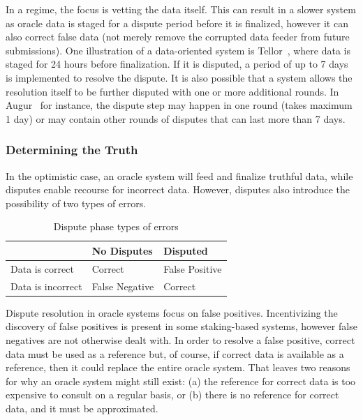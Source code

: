 In a  regime, the focus is vetting the data itself. This can result in a slower system as oracle data is staged for a dispute period before it is finalized, however it can also correct false data (not merely remove the corrupted data feeder from future submissions). One illustration of a data-oriented system is Tellor~\cite{tellorWhitepaper,tellordispute}, where data is staged for 24 hours before finalization. If it is disputed, a period of up to 7 days is implemented to resolve the dispute. It is also possible that a system allows the resolution itself to be further disputed with one or more additional rounds. In Augur~\cite{peterson2015augur} for instance, the dispute step may happen in one round (takes maximum 1 day) or may contain other rounds of disputes that can last more than 7 days. 



\subsubsection{Determining the Truth}

In the optimistic case, an oracle system will feed and finalize truthful data, while disputes enable recourse for incorrect data. However, disputes also introduce the possibility of two types of errors.

\begin{table}[t]
	\centering
\begin{tabular}{l|l|l|}
& No Disputes & Disputed \\ \hline
Data is correct & Correct & False Positive \\
Data is incorrect & False Negative & Correct \\
\end{tabular}
\caption[Dispute Phase Types of Errors]{Dispute phase types of errors}
\end{table}

Dispute resolution in oracle systems focus on false positives. Incentivizing the discovery of false positives is present in some staking-based systems, however false negatives are not otherwise dealt with. In order to resolve a false positive, correct data must be used as a reference but, of course, if correct data is available as a reference, then it could replace the entire oracle system. That leaves two reasons for why an oracle system might still exist: (a) the reference for correct data is too expensive to consult on a regular basis, or (b) there is no reference for correct data, and it must be approximated. 

